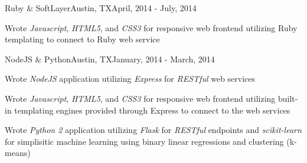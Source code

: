 \documentclass[10pt,a4paper]{article}
\begin{document}
{\begin{resumeinfo}{Ruby \& SoftLayer}{Austin, TX}{April, 2014 - July, 2014}
        \item Wrote \textit{Javascript}, \textit{HTML5}, and \textit{CSS3} for
        responsive web frontend utilizing Ruby templating to connect to Ruby 
        web service
    \end{resumeinfo}
    \addvspace{1em}
    \begin{resumeinfo}{NodeJS \& Python}{Austin, TX}{January, 2014 - March, 2014}
        \item Wrote \textit{NodeJS} application utilizing \textit{Express} for 
        \textit{RESTful} web services

        \item Wrote \textit{Javascript}, \textit{HTML5}, and \textit{CSS3} for
        responsive web frontend utilizing built-in templating engines provided
        through Express to connect to the web services

        \item Wrote \textit{Python 2} application utilizing \textit{Flask} for
        \textit{RESTful} endpoints and \textit{scikit-learn} for simplisitic
        machine learning using binary linear regressions and clustering 
        (k-means)
    \end{resumeinfo}
}
    
\end{document}
